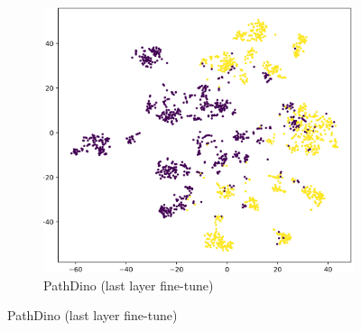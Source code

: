 \documentclass[peerreview]{IEEEtran}
\begin{document}
\begin{figure}[ht]
\begin{subfigure}[b]{0.3\textwidth}
    \end{subfigure}
    \hfill
    \begin{subfigure}[b]{0.3\textwidth}
        \includegraphics[width=\textwidth]{figure/pathdino_last_layer_finetune_tsne.png}
        \caption{PathDino (last layer fine-tune)}
        \label{fig:tsne_pathdino_last_layer_finetune}
    \end{subfigure}

    \hfill


\end{figure}
\end{document}
